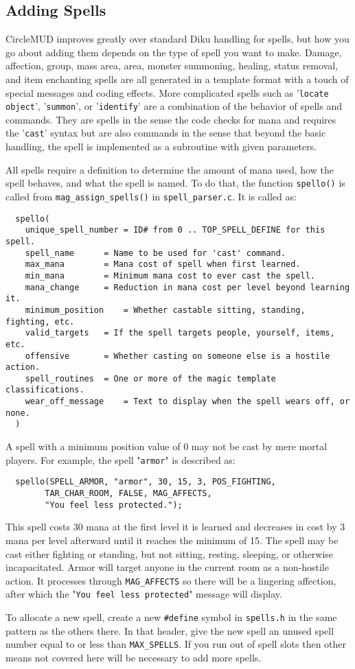\documentclass[11pt]{article}
\begin{document}
\subsection{Adding Spells}
CircleMUD improves greatly over standard Diku handling for spells, but how you go about adding them depends on the type of spell you want to make.  Damage, affection, group, mass area, area, monster summoning, healing, status removal, and item enchanting spells are all generated in a template format with a touch of special messages and coding effects.  More complicated spells such as '\texttt{locate object}', '\texttt{summon}', or '\texttt{identify}' are a combination of the behavior of spells and commands.  They are spells in the sense the code checks for mana and requires the '\texttt{cast}' syntax but are also commands in the sense that beyond the basic handling, the spell is implemented as a subroutine with given parameters.
\par
All spells require a definition to determine the amount of mana used, how the spell behaves, and what the spell is named.  To do that, the function \texttt{spello()} is called from \texttt{mag\_assign\_spells()} in \texttt{spell\_parser.c}.  It is called as:
\begin{verbatim}
  spello(
    unique_spell_number	= ID# from 0 .. TOP_SPELL_DEFINE for this spell.
    spell_name		= Name to be used for 'cast' command.
    max_mana		= Mana cost of spell when first learned.
    min_mana		= Minimum mana cost to ever cast the spell.
    mana_change		= Reduction in mana cost per level beyond learning it.
    minimum_position	= Whether castable sitting, standing, fighting, etc.
    valid_targets	= If the spell targets people, yourself, items, etc.
    offensive		= Whether casting on someone else is a hostile action.
    spell_routines	= One or more of the magic template classifications.
    wear_off_message	= Text to display when the spell wears off, or none.
  )
\end{verbatim}
A spell with a minimum position value of 0 may not be cast by mere mortal players. For example, the spell "\texttt{armor}" is described as:
\begin{verbatim}
  spello(SPELL_ARMOR, "armor", 30, 15, 3, POS_FIGHTING,
        TAR_CHAR_ROOM, FALSE, MAG_AFFECTS,
        "You feel less protected.");
\end{verbatim}
This spell costs 30 mana at the first level it is learned and decreases in cost by 3 mana per level afterward until it reaches the minimum of 15.  The spell may be cast either fighting or standing, but not sitting, resting, sleeping, or otherwise incapacitated.  Armor will target anyone in the current
room as a non-hostile action.  It processes through \texttt{MAG\_AFFECTS} so there will be a lingering affection, after which the "\texttt{You feel less protected}" message will display.
\par
To allocate a new spell, create a new \texttt{\#define} symbol in \texttt{spells.h} in the same pattern as the others there. In that header, give the new spell an unused spell number equal to or less than \texttt{MAX\_SPELLS}.  If you run out of spell slots then other means not covered here will be necessary to add more spells.
\end{document}
